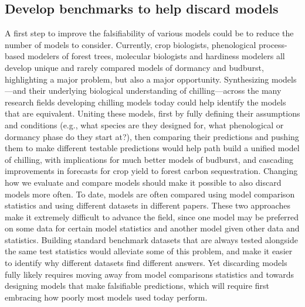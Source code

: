 \documentclass[11pt]{article}
\begin{document}
\subsection*{Develop benchmarks to help discard models} 
A first step to improve the falsifiability of various models could be to reduce the number of models to consider. Currently, crop biologists, phenological process-based modelers of forest trees, molecular biologists and hardiness modelers all develop unique and rarely compared models of dormancy and budburst, highlighting a major problem, but also a major opportunity. Synthesizing models---and their underlying biological understanding of chilling---across the many research fields developing chilling models today could help identify the models that are equivalent.  Uniting these models, first by fully defining their assumptions and conditions (e.g., what species are they designed for, what phenological or dormancy phase do they start at?), then comparing their predictions and pushing them to make different testable predictions would help path build a unified model of chilling, with implications for much better models of budburst, and cascading improvements in forecasts for crop yield to forest carbon sequestration. 
Changing how we evaluate and compare models should make it possible to also discard models more often. To date, models are often compared using model comparison statistics and using different datasets in different papers. These two approaches make it extremely difficult to advance the field, since one model may be preferred on some data for certain model statistics and another model given other data and statistics. Building standard benchmark datasets that are always tested alongside the same test statistics would alleviate some of this problem, and make it easier to identify why different datasets find different answers. Yet discarding models fully likely requires moving away from model comparisons statistics and towards designing models that make falsifiable predictions, which will require first embracing how poorly most models used today perform. 
\end{document}
